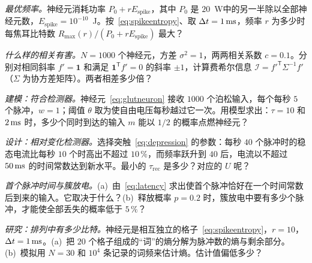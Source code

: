 \begin{exercise}[\lvlB]
\label{ex:04:2}
\emph{最优频率。}神经元消耗功率 $P_0+rE_{\text{spike}}$，其中 $P_0$ 是 $20$~W中的另一半除以全部神经元数，$E_{\text{spike}}=10^{-10}$~J。按~\eqref{eq:spikeentropy}、取 $\Delta t=1\,\text{ms}$，频率 $r$ 为多少时每焦耳比特数 $R_{\max}(r)/(P_0+rE_{\text{spike}})$ 最大？
\end{exercise}

\begin{exercise}[\lvlB]
\label{ex:04:3}
\emph{什么样的相关有害。}$N=1000$ 个神经元，方差 $\sigma^2=1$，两两相关系数 $c=0.1$。分别对相同斜率 $f'=\mathbf 1$ 和满足 $\mathbf 1^{\mathsf T}f'=0$ 的斜率 $\pm1$，计算费希尔信息 $\mathcal I=f'^{\mathsf T}\Sigma^{-1}f'$（$\Sigma$ 为协方差矩阵）。两者相差多少倍？
\end{exercise}

\begin{exercise}[\lvlB]
\label{ex:04:4}
\emph{建模：符合检测器。}神经元~\eqref{eq:glutneuron} 接收 $1000$ 个泊松输入，每个每秒 $5$ 个脉冲，$w=1$；阈值 $\theta$ 取为使自由电压每秒越过它一次。用模型求出：$\tau=10$ 和 $2\,\text{ms}$ 时，多少个同时到达的输入 $m$ 能以 $1/2$ 的概率点燃神经元？
\end{exercise}

\begin{exercise}[\lvlB]
\label{ex:04:5}
\emph{设计：相对变化检测器。}选择突触~\eqref{eq:depression} 的参数：每秒 $40$ 个脉冲时的稳态电流比每秒 $10$ 个时高出不超过 $10\,\%$，而频率跃升到 $40$ 后，电流以不超过 $50\,\text{ms}$ 的时间常数达到新水平。最小的 $\tau_{\text{rec}}$ 是多少？对应的 $U$ 呢？
\end{exercise}

\begin{exercise}[\lvlA]
\label{ex:04:6}
\emph{首个脉冲时间与簇放电。}(a)~由~\eqref{eq:latency} 求出使首个脉冲恰好在一个时间常数后到来的输入。它取决于什么？(b)~释放概率 $p=0.2$ 时，簇放电中要有多少个脉冲，才能使全部丢失的概率低于 $5\,\%$？
\end{exercise}

\begin{exercise}[\lvlC]
\label{ex:04:7}
\emph{研究：排列中有多少比特。}神经元是相互独立的格子~\eqref{eq:spikeentropy}，$r=10$，$\Delta t=1\,\text{ms}$。(a)~把 $20$ 个格子组成的“词”的熵分解为脉冲数的熵与剩余部分。(b)~模拟用 $N=30$ 和 $10^4$ 条记录的词频来估计熵。估计值偏低多少？
\end{exercise}
